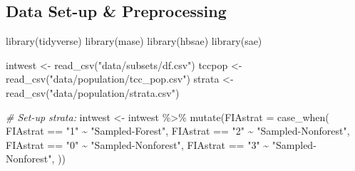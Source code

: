 \documentclass[12pt,twoside]{reedthesis}
\newenvironment{Shaded}{\begin{snugshade}}{\end{snugshade}}
\newcommand{\AttributeTok}[1]{\textcolor[rgb]{0.77,0.63,0.00}{#1}}
\newcommand{\CommentTok}[1]{\textcolor[rgb]{0.56,0.35,0.01}{\textit{#1}}}
\newcommand{\FunctionTok}[1]{\textcolor[rgb]{0.00,0.00,0.00}{#1}}
\newcommand{\NormalTok}[1]{#1}
\newcommand{\OtherTok}[1]{\textcolor[rgb]{0.56,0.35,0.01}{#1}}
\newcommand{\SpecialCharTok}[1]{\textcolor[rgb]{0.00,0.00,0.00}{#1}}
\newcommand{\StringTok}[1]{\textcolor[rgb]{0.31,0.60,0.02}{#1}}
\begin{document}
\hypertarget{data-set-up-preprocessing}{%
\subsection{Data Set-up \& Preprocessing}\label{data-set-up-preprocessing}}
\begin{Shaded}
\begin{Highlighting}[]
\FunctionTok{library}\NormalTok{(tidyverse)}
\FunctionTok{library}\NormalTok{(mase)}
\FunctionTok{library}\NormalTok{(hbsae)}
\FunctionTok{library}\NormalTok{(sae)}
\end{Highlighting}
\end{Shaded}
\begin{Shaded}
\begin{Highlighting}[]
\NormalTok{intwest }\OtherTok{\textless{}{-}} \FunctionTok{read\_csv}\NormalTok{(}\StringTok{"data/subsets/df.csv"}\NormalTok{)}
\NormalTok{tccpop }\OtherTok{\textless{}{-}} \FunctionTok{read\_csv}\NormalTok{(}\StringTok{"data/population/tcc\_pop.csv"}\NormalTok{)}
\NormalTok{strata }\OtherTok{\textless{}{-}} \FunctionTok{read\_csv}\NormalTok{(}\StringTok{"data/population/strata.csv"}\NormalTok{)}
\end{Highlighting}
\end{Shaded}
\begin{Shaded}
\begin{Highlighting}[]
\CommentTok{\# Set{-}up strata:}
\NormalTok{intwest }\OtherTok{\textless{}{-}}\NormalTok{ intwest }\SpecialCharTok{\%\textgreater{}\%}
  \FunctionTok{mutate}\NormalTok{(}\AttributeTok{FIAstrat =} \FunctionTok{case\_when}\NormalTok{(}
\NormalTok{    FIAstrat }\SpecialCharTok{==} \StringTok{"1"} \SpecialCharTok{\textasciitilde{}} \StringTok{"Sampled{-}Forest"}\NormalTok{,}
\NormalTok{    FIAstrat }\SpecialCharTok{==} \StringTok{"2"} \SpecialCharTok{\textasciitilde{}} \StringTok{"Sampled{-}Nonforest"}\NormalTok{,}
\NormalTok{    FIAstrat }\SpecialCharTok{==} \StringTok{"0"} \SpecialCharTok{\textasciitilde{}} \StringTok{"Sampled{-}Nonforest"}\NormalTok{,}
\NormalTok{    FIAstrat }\SpecialCharTok{==} \StringTok{"3"} \SpecialCharTok{\textasciitilde{}} \StringTok{"Sampled{-}Nonforest"}\NormalTok{,}
\NormalTok{  )) }
\end{Highlighting}
\end{Shaded}
\end{document}
